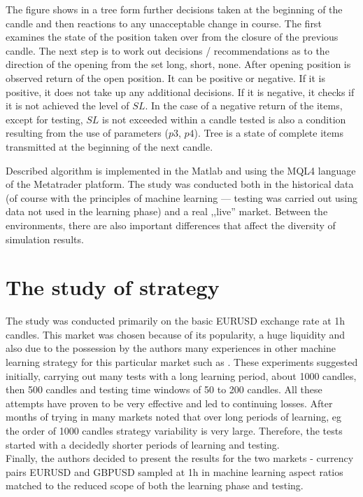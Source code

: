 \documentclass[runningheads,a4paper]{llncs}
\begin{document}
\FloatBarrier
\vspace{-1em}
The figure shows in a tree form further decisions taken at the beginning of the candle and then reactions to any unacceptable change in course. The first examines the state of the position taken over from the closure of the previous candle. The next step is to work out decisions / recommendations as to the direction of the opening from the set {long, short, none}. After opening position is observed return of the open position. It can be positive or negative. If it is positive, it does not take up any additional decisions. If it is negative, it checks if it is not achieved the level of $SL$. In the case of a negative return of the items, except for testing, $SL$ is not exceeded within a candle tested is also a condition resulting from the use of parameters ($p3$, $p4$). Tree is a state of complete items transmitted at the beginning of the next candle.

Described algorithm is implemented in the Matlab and using the MQL4 language of the Metatrader platform. The study was conducted both in the historical data (of course with the principles of machine learning --- testing was carried out using data not used in the learning phase) and a real ,,live'' market. Between the environments, there are also important differences that affect the diversity of simulation results.

\section{The study of strategy}
The study was conducted primarily on the basic EURUSD exchange rate at 1h candles. This market was chosen because of its popularity, a huge liquidity and also due to the possession by the authors many experiences in other machine learning strategy for this particular market such as \cite{Wilinski2014}\cite{Wilinski}. These experiments suggested initially, carrying out many tests with a long learning period, about 1000 candles, then 500 candles and testing time windows of 50 to 200 candles. All these attempts have proven to be very effective and led to continuing losses. After months of trying in many markets noted that over long periods of learning, eg the order of 1000 candles strategy variability is very large. Therefore, the tests started with a decidedly shorter periods of learning and testing.\\

Finally, the authors decided to present the results for the two markets - currency pairs EURUSD and GBPUSD sampled at 1h in machine learning aspect ratios matched to the reduced scope of both the learning phase and testing.\\
\end{document}
